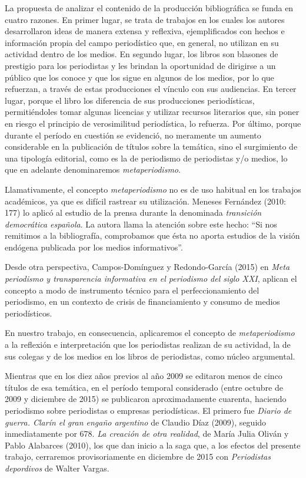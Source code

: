 La propuesta de analizar el contenido de la producción bibliográfica se funda en cuatro razones. En primer lugar, se trata de trabajos en los cuales los autores desarrollaron ideas de manera extensa y reflexiva, ejemplificados con hechos e información propia del campo periodístico que, en general, no utilizan en su actividad dentro de los medios. En segundo lugar, los libros son blasones de prestigio para los periodistas y les brindan la oportunidad de dirigirse a un público que los conoce y que los sigue en algunos de los medios, por lo que refuerzan, a través de estas producciones el vínculo con sus audiencias. En tercer lugar, porque el libro los diferencia de sus producciones periodísticas, permitiéndoles tomar algunas licencias y utilizar recursos literarios que, sin poner en riesgo el principio de verosimilitud periodística, lo refuerza. Por último, porque durante el período en cuestión se evidenció, no meramente un aumento considerable en la publicación de títulos sobre la temática, sino el surgimiento de una tipología editorial, como es la de periodismo de periodistas y/o medios, lo que en adelante denominaremos \emph{metaperiodismo}.

Llamativamente, el concepto \emph{metaperiodismo} no es de uso habitual en los trabajos académicos, ya que es difícil rastrear su utilización. Meneses Fernández (2010: 177) lo aplicó al estudio de la prensa durante la denominada \emph{transición democrática española}. La autora llama la atención sobre este hecho: ``Si nos remitimos a la bibliografía, comprobamos que ésta no aporta estudios de la visión endógena publicada por los medios informativos''.

Desde otra perspectiva, Campos-Domínguez y Redondo-García (2015) en \emph{Meta periodismo y transparencia informativa en el periodismo del siglo XXI}, aplican el concepto a modo de instrumento técnico para el perfeccionamiento del periodismo, en un contexto de crisis de financiamiento y consumo de medios periodísticos.

En nuestro trabajo, en consecuencia, aplicaremos el concepto de \emph{metaperiodismo} a la reflexión e interpretación que los periodistas realizan de su actividad, la de sus colegas y de los medios en los libros de periodistas, como núcleo argumental.

Mientras que en los diez años previos al año 2009 se editaron menos de cinco títulos de esa temática, en el período temporal considerado (entre octubre de 2009 y diciembre de 2015) se publicaron aproximadamente cuarenta, haciendo periodismo sobre periodistas o empresas periodísticas. El primero fue \emph{Diario de guerra. Clarín el gran engaño argentino} de Claudio Díaz (2009), seguido inmediatamente por 678. \emph{La creación de otra realidad}, de María Julia Oliván y Pablo Alabarces (2010), los que dan inicio a la saga que, a los efectos del presente trabajo, cerraremos provisoriamente en diciembre de 2015 con \emph{Periodistas depordivos} de Walter Vargas.

